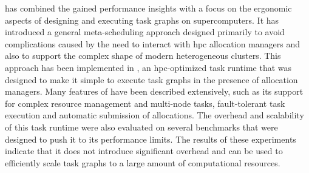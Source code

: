  has combined the gained performance insights with a focus on
the ergonomic aspects of designing and executing task graphs on supercomputers. It has introduced a
general meta-scheduling approach designed primarily to avoid complications caused by the need to
interact with \gls{hpc} allocation managers and also to support the complex shape
of modern heterogeneous clusters. This approach has been implemented in \hyperqueue{},
an \gls{hpc}-optimized task runtime that was designed to make it simple to execute
task graphs in the presence of allocation managers. Many features of \hyperqueue{}
have been described extensively, such as its support for complex resource management and multi-node
tasks, fault-tolerant task execution and automatic submission of allocations. The overhead and
scalability of this task runtime were also evaluated on several benchmarks that were designed to
push it to its performance limits. The results of these experiments indicate that it does not
introduce significant overhead and can be used to efficiently scale task graphs to a large amount
of computational resources.

